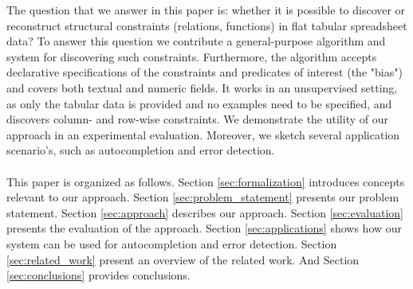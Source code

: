\documentclass{sig-alternate-05-2015}
\begin{document}
The question that we answer in this paper is: whether it is possible to discover or reconstruct structural constraints (relations, functions) in flat tabular spreadsheet data?
To answer this question we contribute a general-purpose algorithm and system for discovering such constraints. Furthermore, the algorithm accepts declarative specifications of the constraints and predicates of interest (the "bias") and covers both textual and numeric fields. It works in an unsupervised setting, as only the tabular data is provided and no examples need to be specified, and discovers column- and row-wise constraints.
We demonstrate the utility of our approach in an experimental evaluation.
Moreover, we sketch several application scenario's, such as autocompletion and error detection.
\\\\
This paper is organized as follows.
Section \ref{sec:formalization} introduces concepts relevant to our approach. Section \ref{sec:problem_statement} presents our problem statement. Section \ref{sec:approach} describes our approach. Section \ref{sec:evaluation} presents the evaluation of the approach. Section \ref{sec:applications} shows how our system can be used for autocompletion and error detection. Section \ref{sec:related_work} present an overview of the related work. And Section \ref{sec:conclusions} provides conclusions.


\end{document}
